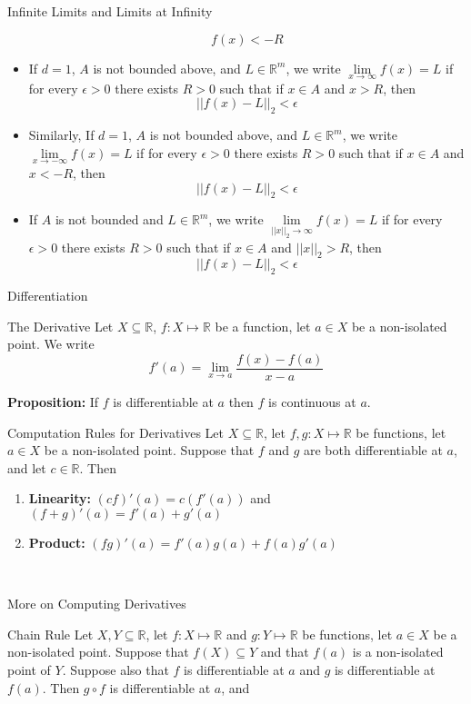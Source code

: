 \documentclass{article}
\newcommand{\real}{\mathbb{R}}
\begin{document}
\begin{multicols*}{3}
\begin{blackbox}{Infinite Limits and Limits at Infinity}
\begin{itemize}
        \[f(x) < -R\] 
        \item If $d = 1$, $A$ is not bounded above, and $L \in \real^m$, we write $\lim\limits_{x\rightarrow \infty} f(x) = L$ if for every $\epsilon > 0$ there exists $R > 0$  such that if $x \in A$ and $x > R$, then 
        \[||f(x) - L||_2 < \epsilon\]
        \item Similarly, If $d = 1$, $A$ is not bounded above, and $L \in \real^m$, we write $\lim\limits_{x\rightarrow -\infty} f(x) = L$ if for every $\epsilon > 0$ there exists $R > 0$  such that if $x \in A$ and $x < -R$, then 
        \[||f(x) - L||_2 < \epsilon\]
        \item If $A$ is not bounded and $L \in \real^m$, we write $\lim\limits_{||x||_2 \rightarrow \infty} f(x) = L$ if for every $\epsilon > 0$ there exists $R > 0$ such that if $x \in A$ and $||x||_2 > R$, then 
        \[||f(x) - L||_2 < \epsilon\]
    \end{itemize}
\end{blackbox}
\begin{blackbox}{Differentiation}
    \begin{bluebox}{The Derivative}
        Let $X \subseteq \mathbb{R}$, $f: X \mapsto \mathbb{R}$ be a function, let $a \in X$ be a non-isolated point. We write \\[-2ex]
        \[f'(a) = \lim_{x\rightarrow a}\frac{f(x) - f(a)}{x-a}\]
    \end{bluebox}
    \textbf{Proposition:} If $f$ is differentiable at $a$ then $f$ is continuous at $a$.
    \begin{pinkbox}{Computation Rules for Derivatives}
    Let $X \subseteq \real$, let $f,g : X \mapsto \real$ be functions, let $a \in X$ be a non-isolated point. Suppose that $f$ and $g$ are both differentiable at $a$, and let $c \in \real$. Then
    \raggedright
    \begin{enumerate}[label=(\roman*)]
        \item \textbf{Linearity: }$(cf)'(a) = c(f'(a))$ and $(f+g)'(a) = f'(a) + g'(a)$
        \item \textbf{Product: }$(fg)'(a) = f'(a)g(a) + f(a)g'(a)$
    \end{enumerate}
    \end{pinkbox}\\[-1ex]
\end{blackbox}
\begin{blackbox}{More on Computing Derivatives}
    \begin{redbox}{Chain Rule}
        Let $X,Y \subseteq \real$, let $f: X \mapsto \real$ and $g: Y \mapsto \real$ be functions, let $a \in X$ be a non-isolated point. Suppose that $f(X) \subseteq Y$ and that $f(a)$ is a non-isolated point of $Y$. Suppose also that $f$ is differentiable at $a$ and $g$ is differentiable at $f(a)$. Then $g\circ f$ is differentiable at $a$, and \\[-2ex]

\end{redbox}
\end{blackbox}
\end{multicols*}
\end{document}
